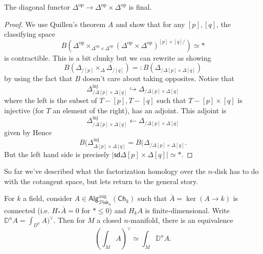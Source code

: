 \documentclass{amsart}
\newcommand{\Disk}{\mathscr{D}\mathsf{isk}_n}
\newcommand{\op}{\mathrm{op}}
\newcommand{\aug}{\mathrm{aug}}
\begin{document}
\begin{lemma}
    The diagonal functor $\Delta^\op\to\Delta^\op\times\Delta^\op$ is final.
\end{lemma}
\begin{proof}
    We use Quillen's theorem $A$ and show that for any $[p],[q]$, the classifying
    space
    \begin{equation*}
        B\left( \Delta^\op\times_{\Delta^\op\times\Delta^\op}(\Delta^\op\times\Delta^\op)^{[p]\times[q]/} \right)\simeq *
    \end{equation*}
    is contractible. This is a bit clunky but we can rewrite as showing
    \begin{equation*}
        B\left( \Delta_{/[p]}\times_\Delta\Delta_{/[q]} \right) =: B(\Delta_{/\Delta[p]\times\Delta[q]})
    \end{equation*}
    by using the fact that $B$ doesn't care about taking opposites.
    Notice that
    \begin{equation*}
        \Delta_{/\Delta[p]\times\Delta[q]}^\mathrm{inj} \hookrightarrow \Delta_{/\Delta[p]\times\Delta[q]}
    \end{equation*}
    where the left is the subset of $T-[p],T-[q]$ such that $T-[p]\times[q]$ is injective (for $T$ an element
    of the right), has an adjoint. This adjoint is
    \begin{equation*}
        \Delta^\mathrm{inj}_{/\Delta[p]\times\Delta[q]}\leftarrow \Delta_{/\Delta[p]\times\Delta[q]}
    \end{equation*}
    given by
    Hence
    \begin{equation*}
        B(\Delta^\mathrm{inj}_{\Delta[p]\times\Delta[q]}=B(\Delta_{/\Delta[p]\times\Delta[q]}.
    \end{equation*}
    But the left hand side is precisely $|\mathsf{sd}\Delta[p]\times\Delta[q]|\simeq *$.
\end{proof}

So far we've described what the factorization homology over the $n$-disk has to do with the cotangent space,
but lets return to the general story.

\begin{theorem}
    For $k$ a field, consider $A\in\mathsf{Alg}^\aug_{\Disk}(\mathsf{Ch}_k)$ such that $\bar A=\ker(A\to k)$
    is connected (i.e. $H_*\bar A=0$ for $*\leq 0$) and $H_kA$ is finite-dimensional.
    Write $\mathbb{D}^nA = \int_{D^n}A)^\vee$. Then for $M$ a closed $n$-manifold, there is an equivalence
    \begin{equation*}
        \left( \int_M A \right)^\vee \simeq \int_M \mathbb{D}^n A.
    \end{equation*}
\end{theorem}
\end{document}
